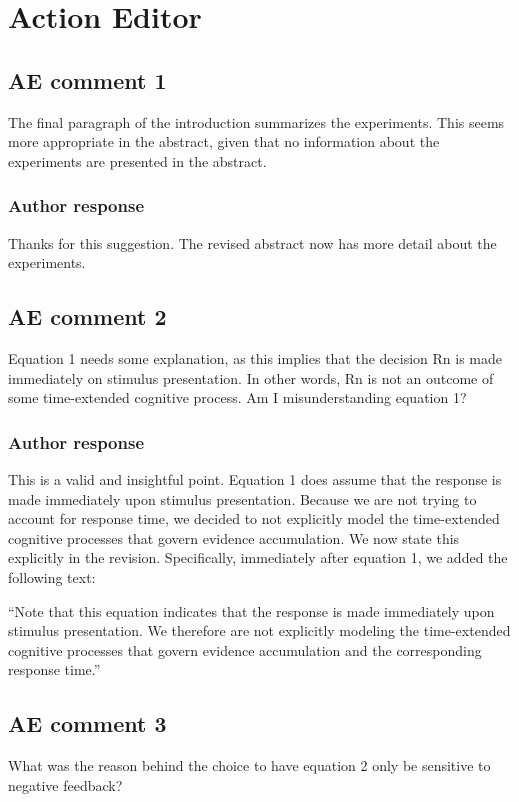 \documentclass[12pt]{article}
\begin{document}
\section*{Action Editor}

\subsection{AE comment 1}
The final paragraph of the introduction summarizes the
experiments. This seems more appropriate in the abstract,
given that no information about the experiments are
presented in the abstract.

\subsubsection{Author response}
Thanks for this suggestion. The revised abstract now has
more detail about the experiments.

\subsection{AE comment 2}
Equation 1 needs some explanation, as this implies that the
decision Rn is made immediately on stimulus presentation. In
other words, Rn is not an outcome of some time-extended
cognitive process. Am I misunderstanding equation 1?

\subsubsection{Author response}
This is a valid and insightful point. Equation 1 does assume
that the response is made immediately upon stimulus
presentation. Because we are not trying to account for
response time, we decided to not explicitly model the
time-extended cognitive processes that govern evidence
accumulation. We now state this explicitly in the revision.
Specifically, immediately after equation 1, we added the
following text:

``Note that this equation indicates that the response is
made immediately upon stimulus presentation. We therefore
are not explicitly modeling the time-extended cognitive
processes that govern evidence accumulation and the
corresponding response time.''

\subsection{AE comment 3}
What was the reason behind the choice to have equation 2
only be sensitive to negative feedback? 
\end{document}
